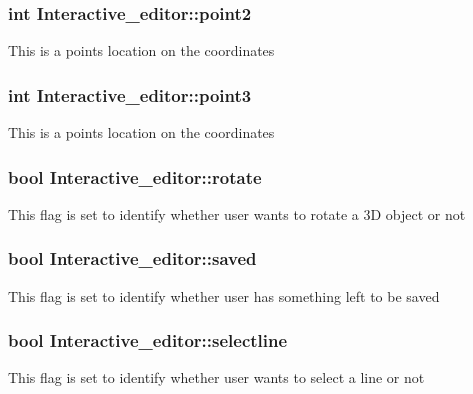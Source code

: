 \subsubsection[{\texorpdfstring{point2}{point2}}]{\setlength{\rightskip}{0pt plus 5cm}int Interactive\+\_\+editor\+::point2}\hypertarget{classInteractive__editor_af60245cb328db4c6b1ca00f1512dfc75}{}\label{classInteractive__editor_af60245cb328db4c6b1ca00f1512dfc75}
This is a point\textquotesingle{}s location on the coordinates 
\subsubsection[{\texorpdfstring{point3}{point3}}]{\setlength{\rightskip}{0pt plus 5cm}int Interactive\+\_\+editor\+::point3}\hypertarget{classInteractive__editor_a9b368072fc0a220476d21079b4bcb739}{}\label{classInteractive__editor_a9b368072fc0a220476d21079b4bcb739}
This is a point\textquotesingle{}s location on the coordinates 
\subsubsection[{\texorpdfstring{rotate}{rotate}}]{\setlength{\rightskip}{0pt plus 5cm}bool Interactive\+\_\+editor\+::rotate}\hypertarget{classInteractive__editor_a9accc369abf6972993bb5c2ba047542c}{}\label{classInteractive__editor_a9accc369abf6972993bb5c2ba047542c}
This flag is set to identify whether user wants to rotate a 3D object or not 
\subsubsection[{\texorpdfstring{saved}{saved}}]{\setlength{\rightskip}{0pt plus 5cm}bool Interactive\+\_\+editor\+::saved}\hypertarget{classInteractive__editor_a2e6cd28cc09c6250bb5aa720acfc16a4}{}\label{classInteractive__editor_a2e6cd28cc09c6250bb5aa720acfc16a4}
This flag is set to identify whether user has something left to be saved 
\subsubsection[{\texorpdfstring{selectline}{selectline}}]{\setlength{\rightskip}{0pt plus 5cm}bool Interactive\+\_\+editor\+::selectline}\hypertarget{classInteractive__editor_ad2e77097ff1ba602c3cdca2905febea7}{}\label{classInteractive__editor_ad2e77097ff1ba602c3cdca2905febea7}
This flag is set to identify whether user wants to select a line or not 
